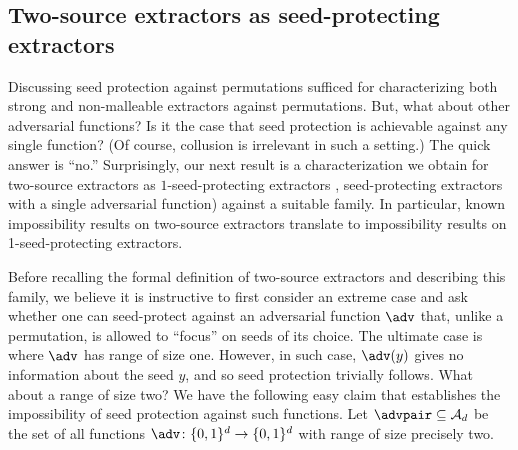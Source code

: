 %

\subsection{Two-source extractors as seed-protecting extractors}\label{sec:intro two source sp}

Discussing seed protection against permutations sufficed for characterizing both strong and non-malleable extractors against permutations. 
But, what about other adversarial functions? Is it the case that seed protection is achievable against any single function?
%
(Of course, collusion is irrelevant in such a setting.) %
The quick answer is %
``no.''   %
Surprisingly, our next result is a characterization we obtain for two-source extractors as $1$-seed-protecting extractors %
\ie,  %
seed-protecting extractors with a single adversarial function) against a suitable family. In particular, known impossibility results on two-source extractors translate to impossibility results on 1-seed-protecting extractors. %

%

Before recalling the formal definition of two-source extractors and describing this family, we believe it is instructive to first consider an extreme case and ask whether one can seed-protect against an adversarial function $\adv$ that, unlike a permutation, is allowed to ``focus'' on seeds of its choice.  The ultimate case is where $\adv$ has range of size one.  %
%
%
However, in such case, $\adv(y)$ gives no information about the seed $y$, and so seed %
protection  %
trivially follows. What about
a  %
range of size two? We have the following easy claim that establishes
the  %
%
impossibility of seed protection against such functions. Let $\advpair \subseteq \mathcal{A}_d$ be the set of all functions $\adv \colon \{0,1\}^d \to \{0,1\}^d$ with range of size precisely two.
%

